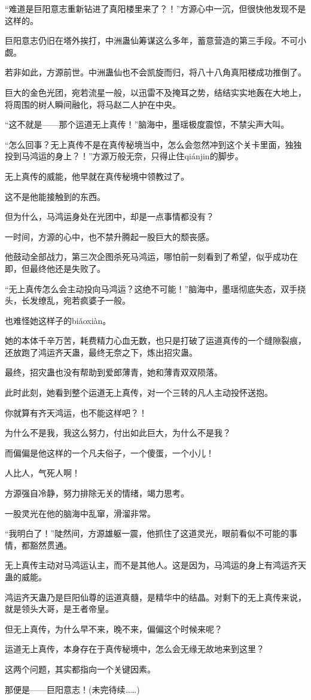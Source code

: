 \begin{this_body}
“难道是巨阳意志重新钻进了真阳楼里来了？！”方源心中一沉，但很快他发现不是这样的。

巨阳意志仍旧在塔外挨打，中洲蛊仙筹谋这么多年，蓄意营造的第三手段。不可小觑。

若非如此，方源前世。中洲蛊仙也不会凯旋而归，将八十八角真阳楼成功推倒了。

巨大的金色光团，宛若流星一般，以迅雷不及掩耳之势，结结实实地轰在大地上，将周围的树人瞬间融化，将马赵二人护在中央。

“这不就是——那个运道无上真传！”脑海中，墨瑶极度震惊，不禁尖声大叫。

“怎么回事？无上真传不是在真传秘境当中，怎么会忽然冲到这个关卡里面，独独投到马鸿运的身上？！”方源万般无奈，只得止住qiánjin的脚步。

无上真传的威能，他早就在真传秘境中领教过了。

这不是他能接触到的东西。

但为什么，马鸿运身处在光团中，却是一点事情都没有？

一时间，方源的心中，也不禁升腾起一股巨大的颓丧感。

他鼓动全部战力，第三次企图杀死马鸿运，哪怕前一刻看到了希望，似乎成功在即，但最终他还是失败了。

“无上真传怎么会主动投向马鸿运？这绝不可能！”脑海中，墨瑶彻底失态，双手挠头，长发缭乱，宛若疯婆子一般。

也难怪她这样子的biǎoxiàn。

她的本体千辛万苦，耗费精力心血无数，也只是打破了运道真传的一个缝隙裂痕，还放跑了鸿运齐天蛊，最终无奈之下，炼出招灾蛊。

最终，招灾蛊也没有帮助到爱郎薄青，她和薄青双双陨落。

此时此刻，她看到整个运道无上真传，对一个三转的凡人主动投怀送抱。

你就算有齐天鸿运，也不能这样吧？！

为什么不是我，我这么努力，付出如此巨大，为什么不是我？

而偏偏是他这样的一个凡夫俗子，一个傻蛋，一个小儿！

人比人，气死人啊！

方源强自冷静，努力排除无关的情绪，竭力思考。

一股灵光在他的脑海中乱窜，滑溜非常。

“我明白了！”陡然间，方源雄躯一震，他抓住了这道灵光，眼前看似不可能的事情，都豁然贯通。

无上真传主动对马鸿运认主，而不是其他人。这是因为，马鸿运的身上有鸿运齐天蛊的威能。

鸿运齐天蛊乃是巨阳仙尊的运道真髓，是精华中的结晶。对剩下的无上真传来说，就是领头大哥，是王者帝皇。

但无上真传，为什么早不来，晚不来，偏偏这个时候来呢？

运道无上真传，本身存在于真传秘境中，怎么会无缘无故地来到这里？

这两个问题，其实都指向一个关键因素。

那便是——巨阳意志！(未完待续……)

\end{this_body}


